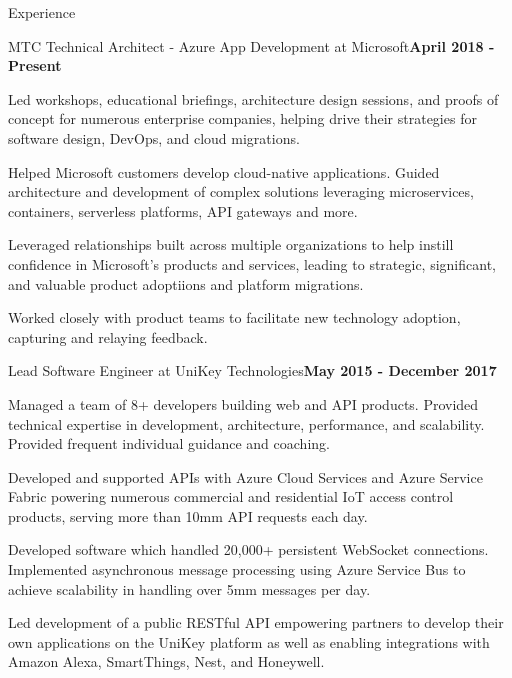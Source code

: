 \documentclass{resume} %
\begin{document}
\begin{rSection}{Experience}


\begin{rSubsection}{MTC Technical Architect - Azure App Development at Microsoft}{\bf April 2018 - Present}{}{}

\item Led workshops, educational briefings, architecture design sessions, and proofs of concept for numerous enterprise companies, helping drive their strategies for software design, DevOps, and cloud migrations.
\item Helped Microsoft customers develop cloud-native applications.  Guided architecture and development of complex solutions leveraging microservices, containers, serverless platforms, API gateways and more.
\item Leveraged relationships built across multiple organizations to help instill confidence in Microsoft's products and services, leading to strategic, significant, and valuable product adoptiions and platform migrations.
\item Worked closely with product teams to facilitate new technology adoption, capturing and relaying feedback.

\end{rSubsection}


\begin{rSubsection}{Lead Software Engineer at UniKey Technologies}{\bf May 2015 - December 2017}{}{}

\item Managed a team of 8+ developers building web and API products.  Provided technical expertise in development, architecture,  performance, and scalability.  Provided frequent individual guidance and coaching.
\item Developed and supported APIs with Azure Cloud Services and Azure Service Fabric powering numerous commercial and residential IoT access control products, serving more than 10mm API requests each day.
\item Developed software which handled 20,000+ persistent WebSocket connections. Implemented asynchronous message processing using Azure Service Bus to achieve scalability in handling over 5mm messages per day.
\item Led development of a public RESTful API empowering partners to develop their own applications on the UniKey platform as well as enabling integrations with Amazon Alexa, SmartThings, Nest, and Honeywell.
\end{rSubsection}


\end{rSection}
\end{document}
